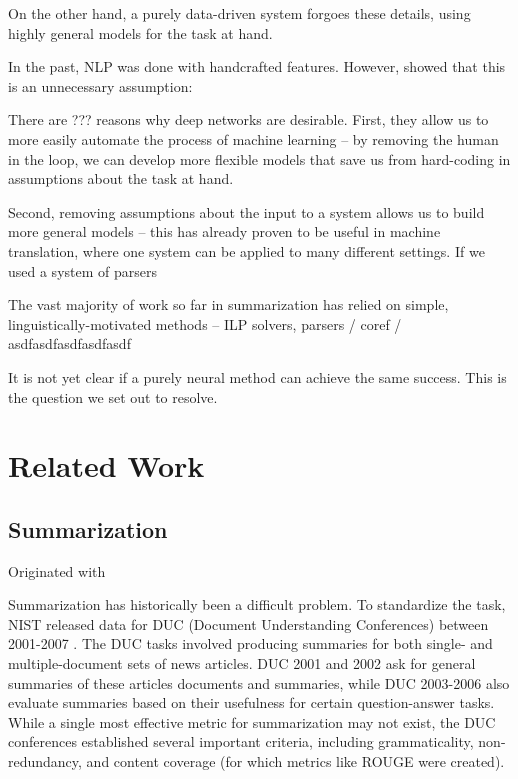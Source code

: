 \documentclass[11pt]{report}
\begin{document}
On the other hand, a purely data-driven system forgoes these details, using highly general models for the task at hand.

In the past, NLP was done with handcrafted features. However, \cite{Collobert2011} showed that this is an unnecessary assumption: %


There are ??? reasons why deep networks are desirable. First, they allow us to more easily automate the process of machine learning -- by removing the human in the loop, we can develop more flexible models that save us from hard-coding in assumptions about the task at hand. %

Second, removing assumptions about the input to a system allows us to build more general models -- this has already proven to be useful in machine translation, where one system can be applied to many different settings. If we used a system of parsers  %

The vast majority of work so far in summarization has relied on simple, linguistically-motivated methods -- ILP solvers, parsers / coref / asdfasdfasdfasdfasdf

It is not yet clear if a purely neural method can achieve the same success. This is the question we set out to resolve.



\chapter{Related Work}

\section{Summarization}

Originated with \cite{luhn1958automatic}

Summarization has historically been a difficult problem. To standardize the task, NIST released data for DUC (Document Understanding Conferences) between 2001-2007 \citep{over2007duc}. The DUC tasks involved producing summaries for both single- and multiple-document sets of news articles. DUC 2001 and 2002 ask for general summaries of these articles documents and summaries, while DUC 2003-2006 also evaluate summaries based on their usefulness for certain question-answer tasks. While a single most effective metric for summarization may not exist, the DUC conferences established several important criteria, including grammaticality, non-redundancy, and content coverage (for which metrics like ROUGE \citep{lin2004rouge} were created).
\end{document}
